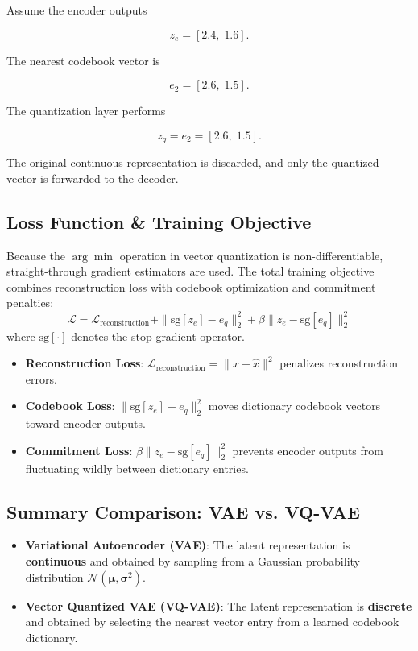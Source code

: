Assume the encoder outputs

\[
z_e=[2.4,\;1.6].
\]

The nearest codebook vector is

\[
e_2=[2.6,\;1.5].
\]

The quantization layer performs

\[
z_q=e_2=[2.6,\;1.5].
\]

The original continuous representation is discarded, and only the quantized vector is forwarded to the decoder.

\vspace{0.3cm}

\begin{center}
\end{center}

\subsection{Loss Function \& Training Objective}
Because the $\arg\min$ operation in vector quantization is non-differentiable, straight-through gradient estimators are used. The total training objective combines reconstruction loss with codebook optimization and commitment penalties:
\[
\mathcal{L} = \mathcal{L}_{\text{reconstruction}} + \|\text{sg}[z_e] - e_q\|_2^2 + \beta \|z_e - \text{sg}[e_q]\|_2^2
\]
where $\text{sg}[\cdot]$ denotes the stop-gradient operator.
\begin{itemize}
    \item \textbf{Reconstruction Loss}: $\mathcal{L}_{\text{reconstruction}} = \|x - \hat{x}\|^2$ penalizes reconstruction errors.
    \item \textbf{Codebook Loss}: $\|\text{sg}[z_e] - e_q\|_2^2$ moves dictionary codebook vectors toward encoder outputs.
    \item \textbf{Commitment Loss}: $\beta \|z_e - \text{sg}[e_q]\|_2^2$ prevents encoder outputs from fluctuating wildly between dictionary entries.
\end{itemize}

\subsection*{Summary Comparison: VAE vs. VQ-VAE}
\begin{itemize}
    \item \textbf{Variational Autoencoder (VAE)}: The latent representation is \textbf{continuous} and obtained by sampling from a Gaussian probability distribution $\mathcal{N}(\boldsymbol{\mu}, \boldsymbol{\sigma}^2)$.
    \item \textbf{Vector Quantized VAE (VQ-VAE)}: The latent representation is \textbf{discrete} and obtained by selecting the nearest vector entry from a learned codebook dictionary.
\end{itemize}

